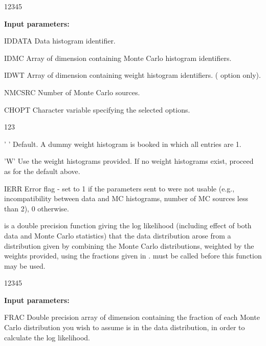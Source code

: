 \begin{DLtt}{12345}
\item[{\rm\bf Input parameters:}]
\item[IDDATA] Data histogram identifier.
\item[IDMC]   Array of dimension  containing Monte Carlo histogram 
              identifiers.
\item[IDWT]   Array of dimension  containing weight histogram 
              identifiers. ( option only).
\item[NMCSRC] Number of Monte Carlo sources.
\item[CHOPT]  Character variable specifying the selected options.
    \begin{DLtt}{123}
      \item[' '] Default. A dummy weight histogram is booked 
                 in which all entries are 1.
      \item['W'] Use the weight histograms provided.  
                 If no weight histograms exist, proceed as for the default above.
    \end{DLtt}
\item[IERR]   Error flag - set to 1 if the parameters sent to 
              were not usable 
              (e.g., incompatibility between data and MC histograms, 
              number of MC sources less than 2), 0 otherwise.
\end{DLtt}
 
 
\Action
{} is a double precision function giving the log likelihood 
(including effect of both data
and Monte Carlo statistics) that the data distribution arose from a
distribution given by combining the Monte Carlo distributions, weighted
by the weights provided, using the fractions given in .
 must be called before this function may be used.
 
\begin{DLtt}{12345}
\item[{\rm\bf Input parameters:}]
\item[FRAC] Double precision array of dimension  containing the 
            fraction of each Monte Carlo distribution you wish to assume is 
            in the data distribution, in order to calculate the log likelihood.
\end{DLtt}


